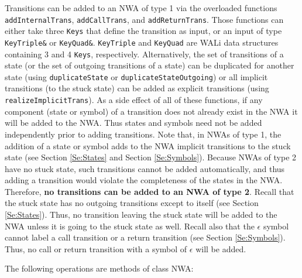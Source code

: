 Transitions can be added to an NWA of type 1 via the overloaded functions
\texttt{addInternalTrans}, \texttt{addCallTrans}, and
\texttt{addReturnTrans}.  Those functions can either take three \texttt{Keys}
that define the transition as input, or an input of type \texttt{KeyTriple\&}
or \texttt{KeyQuad\&}.  \texttt{KeyTriple} and \texttt{KeyQuad} are WALi data
structures containing 3 and 4 \texttt{Keys}, respectively.  Alternatively,
the set of transitions of a state (or the set of outgoing transitions of a
state) can be duplicated for another state (using \texttt{duplicateState} or
\texttt{duplicateStateOutgoing}) or all implicit transitions (to the stuck
state) can be added as explicit transitions (using
\texttt{realizeImplicitTrans}).  As a side effect of all of these functions,
if any component (state or symbol) of a transition does not already exist in
the NWA it will be added to the NWA.  Thus states and symbols need not be
added independently prior to adding transitions.  Note that, in NWAs of type
1, the addition of a state or symbol adds to the NWA implicit transitions to
the stuck state (see Section \ref{Se:States} and Section \ref{Se:Symbols}).
Because NWAs of type 2 have no stuck state, such transitions cannot be added
automatically, and thus adding a transition would violate the completeness of
the states in the NWA.  Therefore, \textbf{no transitions can be added to an
  NWA of type 2}.  Recall that the stuck state has no outgoing transitions
except to itself (see Section \ref{Se:States}).  Thus, no transition leaving
the stuck state will be added to the NWA unless it is going to the stuck
state as well.  Recall also that the \texttt{$\epsilon$} symbol cannot label
a call transition or a return transition (see Section \ref{Se:Symbols}).
Thus, no call or return transition with a symbol of \texttt{$\epsilon$} will
be added. \\

\clearpage

\noindent The following operations are methods of class NWA:

